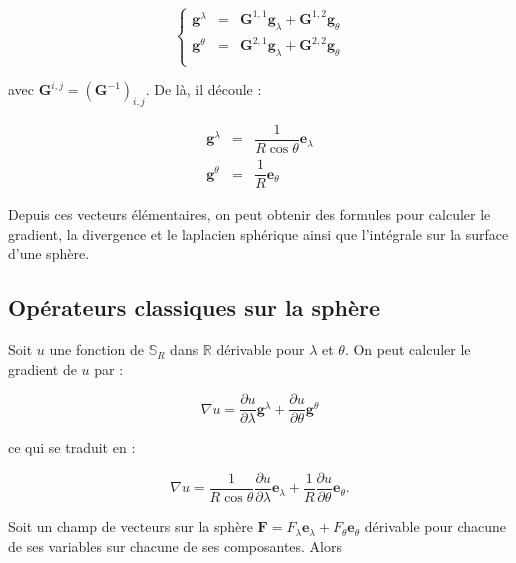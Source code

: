 \begin{equation}
\left\lbrace 
\begin{array}{rcl}
\mathbf{g}^{\lambda} & = & \mathbf{G}^{1,1} \mathbf{g}_{\lambda} + \mathbf{G}^{1,2} \mathbf{g}_{\theta} \\
\mathbf{g}^{\theta} & = & \mathbf{G}^{2,1} \mathbf{g}_{\lambda} + \mathbf{G}^{2,2} \mathbf{g}_{\theta} \\
\end{array}
\right.
\end{equation}

avec $\mathbf{G}^{i,j} = \left( \mathbf{G}^{-1} \right)_{i,j}$.
De là, il découle :

\begin{equation}
\begin{array}{rcl}
\mathbf{g}^{\lambda} & = & \dfrac{1}{R \cos \theta}  \mathbf{e}_{\lambda} \\
\mathbf{g}^{\theta} & = & \dfrac{1}{R} \mathbf{e}_{\theta}
\end{array}
\end{equation}

Depuis ces vecteurs élémentaires, on peut obtenir des formules pour calculer le gradient, la divergence et le laplacien sphérique ainsi que l'intégrale sur la surface d'une sphère.

\subsection{Opérateurs classiques sur la sphère}

Soit $u$ une fonction de $\mathbb{S}_R$ dans $\mathbb{R}$ dérivable pour $\lambda$ et $\theta$. On peut calculer le gradient de $u$ par :

\begin{equation}
\nabla u = \dfrac{\partial u}{\partial \lambda} \mathbf{g}^{\lambda} + \dfrac{\partial u}{\partial \theta} \mathbf{g}^{\theta}
\end{equation}

ce qui se traduit en :

\begin{equation}\label{gradient_lonlat}
\nabla u = \dfrac{1}{R \cos \theta}\dfrac{\partial u}{\partial \lambda} \mathbf{e}_{\lambda} + \dfrac{1}{R} \dfrac{\partial u}{\partial \theta} \mathbf{e}_{\theta}.
\end{equation}

Soit un champ de vecteurs sur la sphère $\mathbf{F} = F_{\lambda} \mathbf{e}_{\lambda} + F_{\theta} \mathbf{e}_{\theta}$ dérivable pour chacune de ses variables sur chacune de ses composantes. Alors 

